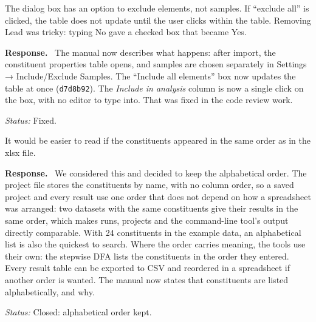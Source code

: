 \documentclass[11pt]{article}
\newcommand{\commit}[1]{\texttt{#1}}
\newcounter{cmt}
\newcounter{grp}
\renewcommand{\thecmt}{\thegrp.\arabic{cmt}}
\newenvironment{reviewer}[1]{%
  \refstepcounter{cmt}%
  \begin{tcolorbox}[enhanced,breakable,colback=commentbg,colframe=usgsgreen!60,
    boxrule=0.4pt,left=6pt,right=6pt,top=4pt,bottom=4pt,
    title={\small\textbf{Comment \thecmt}\hfill\textit{#1}},
    coltitle=black,colbacktitle=usgsgreen!15,fonttitle=\small]}%
  {\end{tcolorbox}}
\newenvironment{response}{\par\noindent\textbf{Response.}\ }{\par\medskip}
\newcommand{\status}[1]{\par\noindent\textit{Status:} #1\par}
\begin{document}
\begin{reviewer}{Importing the data}
The dialog box has an option to exclude elements, not samples. If ``exclude
all'' is clicked, the table does not update until the user clicks within the
table. Removing Lead was tricky: typing No gave a checked box that became Yes.
\end{reviewer}
\begin{response}
The manual now describes what happens: after import, the constituent properties
table opens, and samples are chosen separately in Settings → Include/Exclude
Samples. The ``Include all elements'' box now updates the table at once
(\commit{d7d8b92}). The \textit{Include in analysis} column is now a single
click on the box, with no editor to type into. That was fixed in the code
review work.
\end{response}
\status{Fixed.}

\begin{reviewer}{Importing the data}
It would be easier to read if the constituents appeared in the same order as in
the xlsx file.
\end{reviewer}
\begin{response}
We considered this and decided to keep the alphabetical order. The project file
stores the constituents by name, with no column order, so a saved project and
every result use one order that does not depend on how a spreadsheet was
arranged: two datasets with the same constituents give their results in the
same order, which makes runs, projects and the command-line tool's output
directly comparable. With 24 constituents in the example data, an alphabetical list is also
the quickest to search. Where the order carries meaning, the tools use their
own: the stepwise DFA lists the constituents in the order they entered. Every
result table can be exported to CSV and reordered in a spreadsheet if another
order is wanted. The manual now states that constituents are listed
alphabetically, and why.
\end{response}
\status{Closed: alphabetical order kept.}
\end{document}
